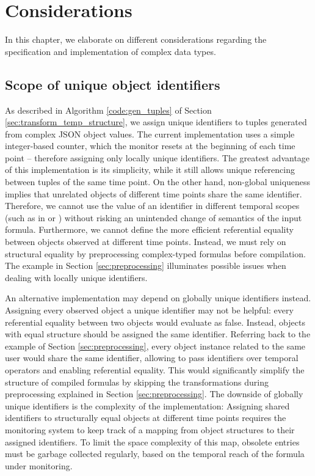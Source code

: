 \chapter{Considerations}

In this chapter, we elaborate on different considerations regarding the specification and implementation of complex data types.

\section{Scope of unique object identifiers}
\label{sec:local_vs_global_idents}
As described in Algorithm \ref{code:gen_tuples} of Section \ref{sec:transform_temp_structure}, we assign unique identifiers to tuples generated from complex JSON object values. The current implementation uses a simple integer-based counter, which the monitor resets at the beginning of each time point -- therefore assigning only locally unique identifiers. The greatest advantage of this implementation is its simplicity, while it still allows unique referencing between tuples of the same time point. On the other hand, non-global uniqueness implies that unrelated objects of different time points share the same identifier. Therefore, we cannot use the value of an identifier in different temporal scopes (such as in  or ) without risking an unintended change of semantics of the input formula. Furthermore, we cannot define the more efficient referential equality between objects observed at different time points. Instead, we must rely on structural equality by preprocessing complex-typed formulas before compilation. The example in Section \ref{sec:preprocessing} illuminates possible issues when dealing with locally unique identifiers.

An alternative implementation may depend on globally unique identifiers instead. Assigning every observed object a unique identifier may not be helpful: every referential equality between two objects would evaluate as false. Instead, objects with equal structure should be assigned the same identifier. Referring back to the example of Section \ref{sec:preprocessing}, every object instance related to the same user would share the same identifier, allowing to pass identifiers over temporal operators and enabling referential equality. This would significantly simplify the structure of compiled formulas by skipping the transformations during preprocessing explained in Section \ref{sec:preprocessing}. The downside of globally unique identifiers is the complexity of the implementation: Assigning shared identifiers to structurally equal objects at different time points requires the monitoring system to keep track of a mapping from object structures to their assigned identifiers. To limit the space complexity of this map, obsolete entries must be garbage collected regularly, based on the temporal reach of the formula under monitoring.

